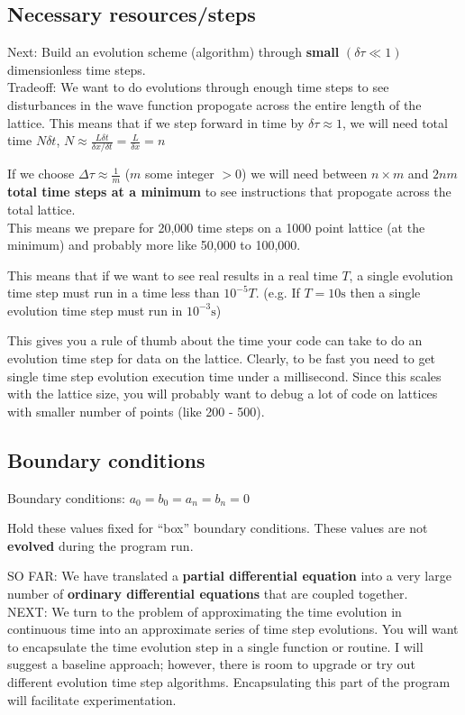 \documentclass[11pt,letterpaper]{article}
\begin{document}
	\subsection{Necessary resources/steps}
	Next: Build an evolution scheme (algorithm) through \textbf{small} $(\delta \tau \ll 1)$ dimensionless time steps.\\
	Tradeoff: We want to do evolutions through enough time steps to see disturbances in the wave function propogate across the entire length of the lattice. This means that if we step forward in time by $\delta \tau \approx 1$, we will need total time $N\delta t$, $N \approx \frac{L\delta t}{\delta x / \delta t} = \frac{L}{\delta x} = n$\par
	If we choose $\Delta \tau \approx \frac{1}{m}$ ($m$ some integer $> 0$) we will need between $n\times m$ and \textbf{$2nm$ total time steps at a minimum} to see instructions that propogate across the total lattice.\\
	This means we prepare for 20,000 time steps on a 1000 point lattice (at the minimum) and probably more like 50,000 to 100,000.\par
	This means that if we want to see real results in a real time $T$, a single evolution time step must run in a time less than $10^{-5} T$. (e.g. If $T=10\si{\second}$ then a single evolution time step must run in $10^{-3}\si{\second}$)\par
	This gives you a rule of thumb about the time your code can take to do an evolution time step for data on the lattice. Clearly, to be fast you need to get single time step evolution execution time under a millisecond. Since this scales with the lattice size, you will probably want to debug a lot of code on lattices with smaller number of points (like 200 - 500).
	\subsection{Boundary conditions}
	Boundary conditions: $a_0=b_0=a_n=b_n=0$\par
	Hold these values fixed for ``box'' boundary conditions. These values are not \textbf{evolved} during the program run.\par
	SO FAR: We have translated a \textbf{partial differential equation} into a very large number of \textbf{ordinary differential equations} that are coupled together.\\
	NEXT: We turn to the problem of approximating the time evolution in continuous time into an approximate series of time step evolutions. You will want to encapsulate the time evolution step in a single function or routine. I will suggest a baseline approach; however, there is room to upgrade or try out different evolution time step algorithms. Encapsulating this part of the program will facilitate experimentation.
\end{document}
